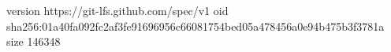 version https://git-lfs.github.com/spec/v1
oid sha256:01a40fa092fc2af3fe91696956c66081754bed05a478456a0e94b475b3f3781a
size 146348
